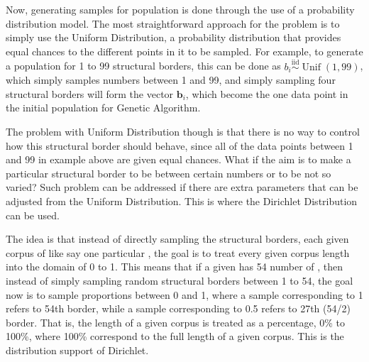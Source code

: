 Now, generating samples for population is done through the use of a probability distribution model. The most straightforward approach for the problem is to simply use the Uniform Distribution, a probability distribution that provides equal chances to the different points in it to be sampled. For example, to generate a population for 1 to 99 structural borders, this can be done as $b_i\overset{\text{iid}}{\sim}\operatorname{Unif}(1,99)$, which simply samples numbers between 1 and 99, and simply sampling four structural borders will form the vector $\mathbf{b}_i$, which become the one data point in the initial population for Genetic Algorithm.

The problem with Uniform Distribution though is that there is no way to control how this structural border should behave, since all of the data points between 1 and 99 in example above are given equal chances. What if the aim is to make a particular structural border to be between certain numbers or to be not so varied? Such problem can be addressed if there are extra parameters that can be adjusted from the Uniform Distribution. This is where the Dirichlet Distribution can be used.

The idea is that instead of directly sampling the structural borders, each given corpus of   like say one particular  , the goal is to treat every given corpus length into the domain of 0 to 1. This means that if a given   has 54 number of  , then instead of simply sampling random structural borders between 1 to 54, the goal now is to sample proportions between 0 and 1, where a sample corresponding to 1 refers to 54th border, while a sample corresponding to 0.5 refers to 27th (54/2) border. That is, the length of a given corpus is treated as a percentage, 0\% to 100\%, where 100\% correspond to the full length of a given corpus. This is the distribution support of Dirichlet.

